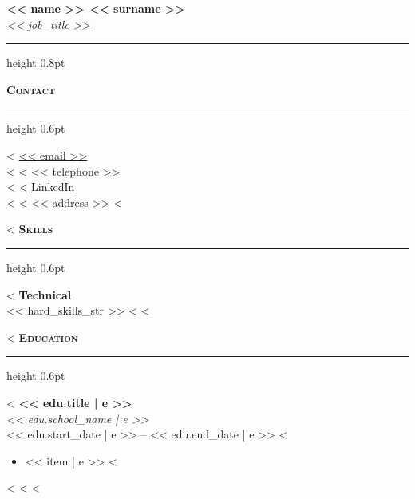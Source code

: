 \documentclass[10pt,a4paper]{article}
\newcommand{\sectionheader}[1]{%
    \vspace{6pt}%
    {\color{navyblue}\textsc{\textbf{#1}}}%
    \vspace{1pt}%
    {\color{rulegray}\hrule height 0.6pt}%
    \vspace{4pt}%
}
\newenvironment{cvitems}{%
    \begin{itemize}[leftmargin=1em, itemsep=1pt, parsep=0pt, topsep=2pt]%
}{%
    \end{itemize}%
}
\begin{document}
\begin{center}
    {\Huge\color{navyblue}\textbf{<< name >> << surname >>}}\\[3pt]
    {\large\textit{<< job_title >>}}
\end{center}

\vspace{6pt}
{\color{rulegray}\hrule height 0.8pt}
\vspace{8pt}

\noindent
\begin{minipage}[t]{0.30\textwidth}

    \sectionheader{Contact}
    <%
    \href{mailto:<< email >>}{\small << email >>}\\[2pt]
    <%
    <%
    \small << telephone >>\\[2pt]
    <%
    <%
    \href{<< linkedin >>}{\small LinkedIn}\\[2pt]
    <%
    <%
    \small << address >>
    <%

    <%
    \sectionheader{Skills}
    <%
    {\small\textbf{Technical}}\\[2pt]
    {\small << hard_skills_str >>}
    <%
    <%

    <%
    \sectionheader{Education}
    <%
    {\small\textbf{<< edu.title | e >>}}\\
    {\small\textit{<< edu.school_name | e >>}}\\
    {\tiny\color{navyblue}<< edu.start_date | e >> -- << edu.end_date | e >>}
    <%
    \begin{cvitems}
        <%
        \item {\small << item | e >>}
        <%
    \end{cvitems}
    <%
    \vspace{4pt}
    <%
    <%

\end{minipage}%
\hfill
\end{document}
